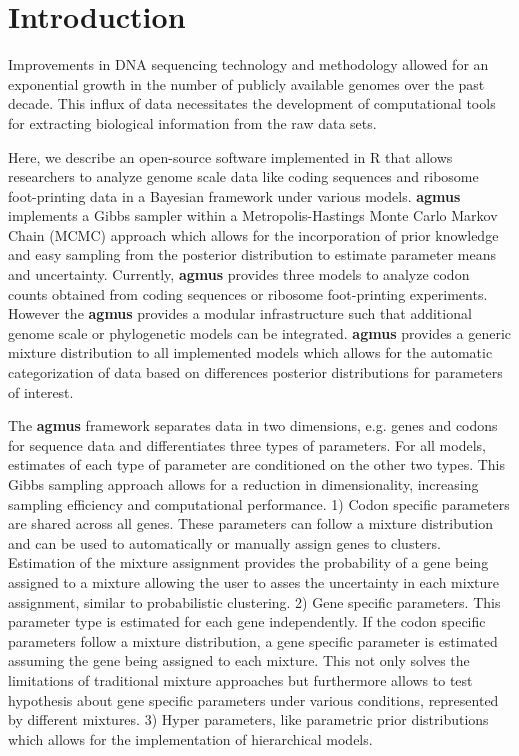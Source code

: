 \documentclass{bioinfo}
\newcommand{\package}{\textbf{agmus }} %
\begin{document}
\section*{Introduction}
Improvements in DNA sequencing technology and methodology allowed for an exponential growth in the number of publicly available genomes over the past decade.
This influx of data necessitates the development of computational tools for extracting biological information from the raw data sets. 

Here, we describe an open-source software implemented in R \citep{rcore} that allows researchers to analyze genome scale data like coding sequences and ribosome foot-printing data in a Bayesian framework under various models. 
\package implements a Gibbs sampler within a Metropolis-Hastings Monte Carlo Markov Chain (MCMC) approach which allows for the incorporation of prior knowledge and easy sampling from the posterior distribution to estimate parameter means and uncertainty.
Currently, \package provides three models to analyze codon counts obtained from coding sequences or ribosome foot-printing experiments. However the \package provides a modular infrastructure such that additional genome scale or phylogenetic models can be integrated. 
\package provides a generic mixture distribution to all implemented models which allows for the automatic categorization of data based on differences posterior distributions for parameters of interest.

The \package framework separates data in two dimensions, e.g. genes and codons for sequence data and differentiates three types of parameters.
For all models, estimates of each type of parameter are conditioned on the other two types. 
This Gibbs sampling approach allows for a reduction in dimensionality, increasing sampling efficiency and computational performance.
1) Codon specific parameters are shared across all genes. These parameters can follow a mixture distribution and can be used to automatically or manually assign genes to clusters.
Estimation of the mixture assignment provides the probability of a gene being assigned to a mixture allowing the user to asses the uncertainty in each mixture assignment, similar to probabilistic clustering.
2) Gene specific parameters. This parameter type is estimated for each gene independently. If the codon specific parameters follow a mixture distribution, a gene specific parameter is estimated assuming the gene being assigned to each mixture. This not only solves the limitations of traditional mixture approaches but furthermore allows to test hypothesis about gene specific parameters under various conditions, represented by different mixtures.
3) Hyper parameters, like parametric prior distributions which allows for the implementation of hierarchical models.
\end{document}
